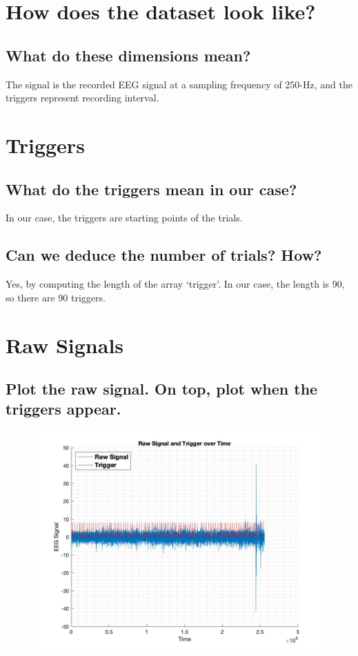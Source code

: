 \documentclass[12pt]{article}
\begin{document}
\maketitle

\section{How does the dataset look like?}
\subsection{What do these dimensions mean?}
The signal is the recorded EEG signal at a sampling frequency of 250-Hz, and the triggers represent recording interval.

\section{Triggers}
\subsection{What do the triggers mean in our case?}
In our case, the triggers are starting points of the trials.

\subsection{Can we deduce the number of trials? How?}
Yes, by computing the length of the array ‘trigger’. In our case, the length is 90, so there are 90 triggers.\clearpage

\section{Raw Signals}
\subsection{Plot the raw signal. On top, plot when the triggers appear.}

\begin{figure}[!htb]
    \includegraphics[scale=0.4]{raw_trigger}
\end{figure}
\end{document}
